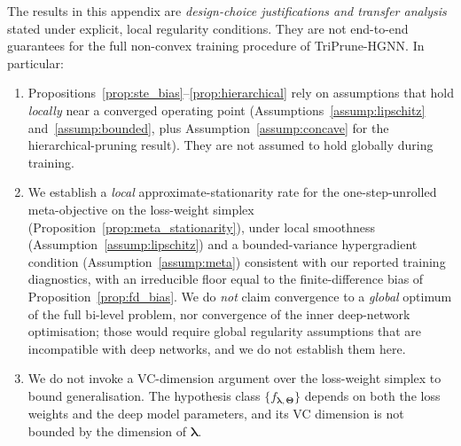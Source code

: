 \documentclass[10pt]{article}
\theoremstyle{plain}
\theoremstyle{definition}
\begin{document}
\begin{tcolorbox}[
    colback=boxBlueBg,
    colframe=boxBlueDeep,
    boxrule=0.6pt,
    arc=2pt,
    left=12pt, right=12pt, top=8pt, bottom=8pt,
    fonttitle=\bfseries\sffamily,
    coltitle=white,
    colbacktitle=boxBlueDeep,
    title=\textsc{Scope and Limitations of This Appendix},
]

\textcolor{boxMuted}{The results in this appendix are \emph{design-choice justifications and transfer analysis} stated under explicit, local regularity conditions. They are not end-to-end guarantees for the full non-convex training procedure of TriPrune-HGNN. In particular:}

\vspace{4pt}

\begin{enumerate}[
    leftmargin=*,
    labelsep=8pt,
    itemsep=5pt,
    topsep=2pt,
    label=\textcolor{boxGreenDeep}{\textbf{\arabic*.}}
]
\item Propositions~\ref{prop:ste_bias}--\ref{prop:hierarchical} rely on assumptions that hold \emph{locally} near a converged operating       point (Assumptions~\ref{assump:lipschitz} and~\ref{assump:bounded}, plus Assumption~\ref{assump:concave} for the hierarchical-pruning result). They are not assumed to hold globally during training.

\item We establish a \emph{local} approximate-stationarity rate for the one-step-unrolled meta-objective on the loss-weight simplex (Proposition~\ref{prop:meta_stationarity}), under local smoothness (Assumption~\ref{assump:lipschitz}) and a bounded-variance hypergradient condition (Assumption~\ref{assump:meta}) consistent with our reported training diagnostics, with an irreducible floor equal to the finite-difference bias of Proposition~\ref{prop:fd_bias}. We do \emph{not} claim convergence to a \emph{global} optimum of the full bi-level problem, nor convergence of the inner deep-network optimisation; those would require global regularity assumptions that are incompatible with deep networks, and we do not establish them here.

\item We do not invoke a VC-dimension argument over the loss-weight simplex to bound generalisation. The hypothesis class $\{f_{\boldsymbol{\lambda},\boldsymbol{\Theta}}\}$ depends on both the loss weights and the deep model parameters, and its VC dimension is not bounded by the dimension of $\boldsymbol{\lambda}$.


\end{enumerate}
\end{tcolorbox}
\end{document}
